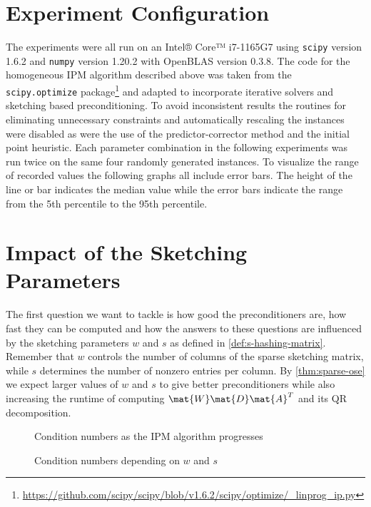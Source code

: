 \section{Experiment Configuration}

The experiments were all run on an Intel® Core™ i7-1165G7 using \texttt{scipy} version 1.6.2 and \texttt{numpy} version 1.20.2 with OpenBLAS version 0.3.8.
The code for the homogeneous IPM algorithm described above was taken from the \texttt{scipy.optimize} package\footnote{\url{https://github.com/scipy/scipy/blob/v1.6.2/scipy/optimize/_linprog_ip.py}} and adapted to incorporate iterative solvers and sketching based preconditioning.
To avoid inconsistent results the routines for eliminating unnecessary constraints and automatically rescaling the instances were disabled as were the use of the predictor-corrector method and the initial point heuristic.
Each parameter combination in the following experiments was run twice on the same four randomly generated instances.
To visualize the range of recorded values the following graphs all include error bars.
The height of the line or bar indicates the median value while the error bars indicate the range from the 5th percentile to the 95th percentile.

\section{Impact of the Sketching Parameters}

The first question we want to tackle is how good the preconditioners are, how fast they can be computed and how the answers to these questions are influenced by the sketching parameters \(w\) and \(s\) as defined in \cref{def:s-hashing-matrix}.
Remember that \(w\) controls the number of columns of the sparse sketching matrix, while \(s\) determines the number of nonzero entries per column.
By \cref{thm:sparse-ose} we expect larger values of \(w\) and \(s\) to give better preconditioners while also increasing the runtime of computing \(\mat{W}\mat{D}\mat{A}^T\) and its QR decomposition.

\begin{figure}[tbp]
  \centering%
  \caption{Condition numbers as the IPM algorithm progresses}%
  \label{fig:condition_number_history}
\end{figure}

\begin{figure}[tbp]%
  \centering%
  \caption{Condition numbers depending on \(w\) and \(s\)}%
  \label{fig:condition_number}
\end{figure}%

